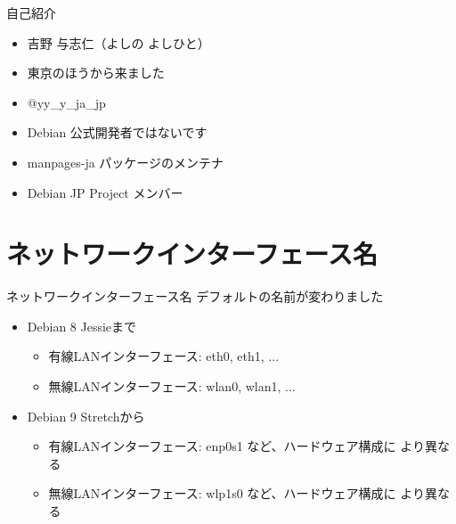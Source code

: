 \frame{\titlepage{}}


\begin{frame}{自己紹介}

\begin{itemize}
 \item 吉野 与志仁（よしの よしひと）
 \item 東京のほうから来ました
 \item @yy\_y\_ja\_jp
 \item Debian 公式開発者ではないです
 \item manpages-ja パッケージのメンテナ
 \item Debian JP Project メンバー
\end{itemize} 
\end{frame}


\section{ネットワークインターフェース名}
\begin{frame}{ネットワークインターフェース名}
 デフォルトの名前が変わりました
 \pause
 
 \begin{itemize}[<+->]
  \item Debian 8 Jessieまで
	\begin{itemize}
	 \item 有線LANインターフェース: eth0, eth1, ...
	 \item 無線LANインターフェース: wlan0, wlan1, ...
	\end{itemize}
  \item Debian 9 Stretchから
	\begin{itemize}
	 \item 有線LANインターフェース: enp0s1 など、ハードウェア構成に
	       より異なる
	 \item 無線LANインターフェース: wlp1s0 など、ハードウェア構成に
	       より異なる
	\end{itemize}
 \end{itemize}
 
\end{frame}

